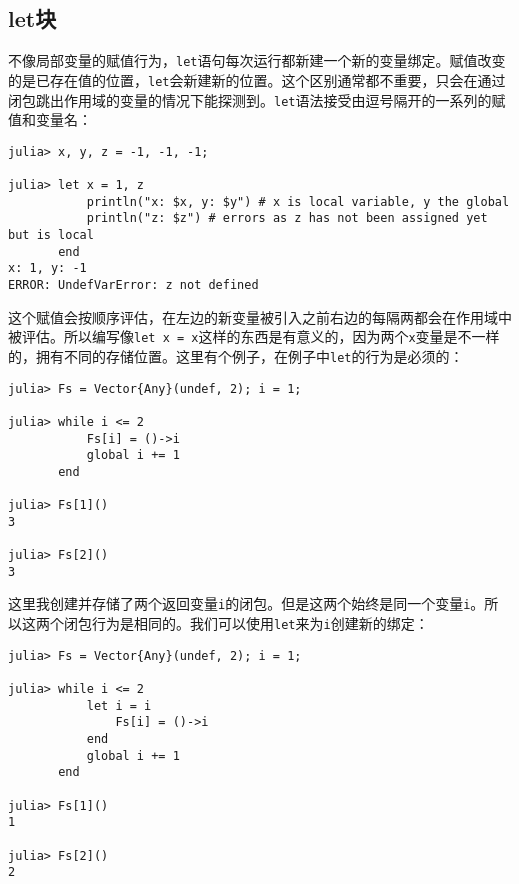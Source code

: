 \hypertarget{5946450612527580652}{}


\subsection{let块}



不像局部变量的赋值行为，\texttt{let}语句每次运行都新建一个新的变量绑定。赋值改变的是已存在值的位置，\texttt{let}会新建新的位置。这个区别通常都不重要，只会在通过闭包跳出作用域的变量的情况下能探测到。\texttt{let}语法接受由逗号隔开的一系列的赋值和变量名：




\begin{verbatim}
julia> x, y, z = -1, -1, -1;

julia> let x = 1, z
           println("x: $x, y: $y") # x is local variable, y the global
           println("z: $z") # errors as z has not been assigned yet but is local
       end
x: 1, y: -1
ERROR: UndefVarError: z not defined
\end{verbatim}



这个赋值会按顺序评估，在左边的新变量被引入之前右边的每隔两都会在作用域中被评估。所以编写像\texttt{let x = x}这样的东西是有意义的，因为两个\texttt{x}变量是不一样的，拥有不同的存储位置。这里有个例子，在例子中\texttt{let}的行为是必须的：




\begin{verbatim}
julia> Fs = Vector{Any}(undef, 2); i = 1;

julia> while i <= 2
           Fs[i] = ()->i
           global i += 1
       end

julia> Fs[1]()
3

julia> Fs[2]()
3
\end{verbatim}



这里我创建并存储了两个返回变量\texttt{i}的闭包。但是这两个始终是同一个变量\texttt{i}。所以这两个闭包行为是相同的。我们可以使用\texttt{let}来为\texttt{i}创建新的绑定：




\begin{verbatim}
julia> Fs = Vector{Any}(undef, 2); i = 1;

julia> while i <= 2
           let i = i
               Fs[i] = ()->i
           end
           global i += 1
       end

julia> Fs[1]()
1

julia> Fs[2]()
2
\end{verbatim}



